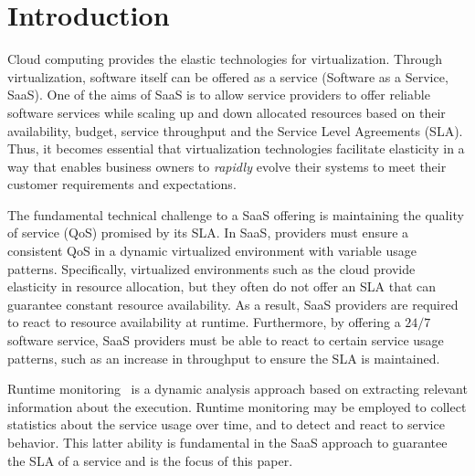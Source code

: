 
\section{Introduction}
\label{sec:introduction}

Cloud computing provides the elastic technologies for virtualization. 
Through virtualization, software itself can be offered as a service (Software as a Service,
SaaS). 
One of the aims of SaaS is to allow service providers to offer reliable software services while scaling up and down allocated resources based on their availability, budget, service throughput and the Service Level Agreements (SLA).
Thus, it becomes essential that virtualization technologies facilitate elasticity in a way that enables business owners to \emph{rapidly} evolve their systems to meet their customer requirements and expectations.

The fundamental technical challenge to a SaaS offering is maintaining the quality
of service (QoS) promised by its SLA. In SaaS, providers must
ensure a consistent QoS in a dynamic virtualized environment with variable
usage patterns. Specifically, virtualized environments such as the cloud
provide elasticity in resource allocation, but they often do not offer an SLA that can
guarantee constant resource availability. As a result, SaaS providers are
required to react to resource availability at runtime. Furthermore, by offering a
$24/7$ software service, SaaS providers must be able to react to certain service
usage patterns, such as an increase in throughput to ensure the SLA is
maintained.

Runtime monitoring~\cite{Logean_monitoring,BratanisDS10} is a dynamic analysis approach
based on
extracting relevant information about the execution.
Runtime monitoring may be employed to collect statistics about the service usage over time, and to detect and react to service behavior. 
This latter ability is fundamental in the SaaS approach to guarantee the SLA of a service
and is the focus of this paper.

